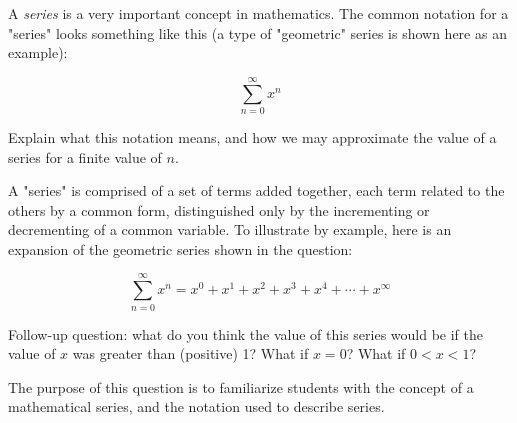 

A {\it series} is a very important concept in mathematics.  The common notation for a "series" looks something like this (a type of "geometric" series is shown here as an example):

$$\sum_{n=0}^{\infty} x^n$$

Explain what this notation means, and how we may approximate the value of a series for a finite value of $n$.







A "series" is comprised of a set of terms added together, each term related to the others by a common form, distinguished only by the incrementing or decrementing of a common variable.  To illustrate by example, here is an expansion of the geometric series shown in the question:

$$\sum_{n=0}^{\infty} x^n = x^0 + x^1 + x^2 + x^3 + x^4 + \cdots + x^{\infty}$$

Follow-up question: what do you think the value of this series would be if the value of $x$ was greater than (positive) 1?  What if $x = 0$?  What if $0 < x < 1$?







The purpose of this question is to familiarize students with the concept of a mathematical series, and the notation used to describe series.




